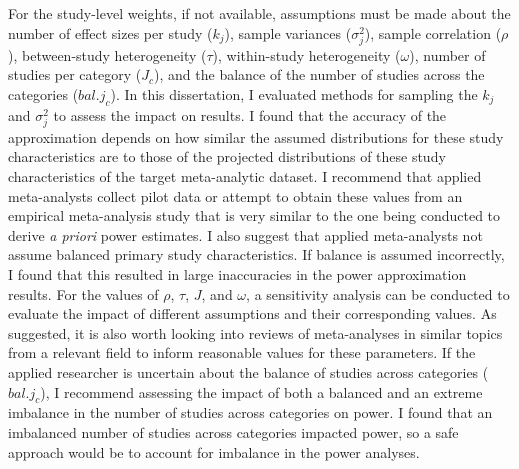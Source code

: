 For the study-level weights, if not available, assumptions must be made about the number of effect sizes per study ($k_j$), sample variances ($\sigma_j^2$), sample correlation ($\rho$), between-study heterogeneity ($\tau$), within-study heterogeneity ($\omega$), number of studies per category ($J_c$), and the balance of the number of studies across the categories ($bal. j_c$). In this dissertation, I evaluated methods for sampling the $k_j$ and $\sigma_j^2$ to assess the impact on results. I found that the accuracy of the approximation depends on how similar the assumed distributions for these study characteristics are to those of the projected distributions of these study characteristics of the target meta-analytic dataset. I recommend that applied meta-analysts collect pilot data or attempt to obtain these values from an empirical meta-analysis study that is very similar to the one being conducted to derive \textit{a priori} power estimates. I also suggest that applied meta-analysts not assume balanced primary study characteristics. If balance is assumed incorrectly, I found that this resulted in large inaccuracies in the power approximation results. For the values of $\rho$, $\tau$, $J$, and $\omega$, a sensitivity analysis can be conducted to evaluate the impact of different assumptions and their corresponding values. As \textcite{vembye2024} suggested, it is also worth looking into reviews of meta-analyses in similar topics from a relevant field to inform reasonable values for these parameters. If the applied researcher is uncertain about the balance of studies across categories ($bal. j_c$), I recommend assessing the impact of both a balanced and an extreme imbalance in the number of studies across categories on power. I found that an imbalanced number of studies across categories impacted power, so a safe approach would be to account for imbalance in the power analyses. 





